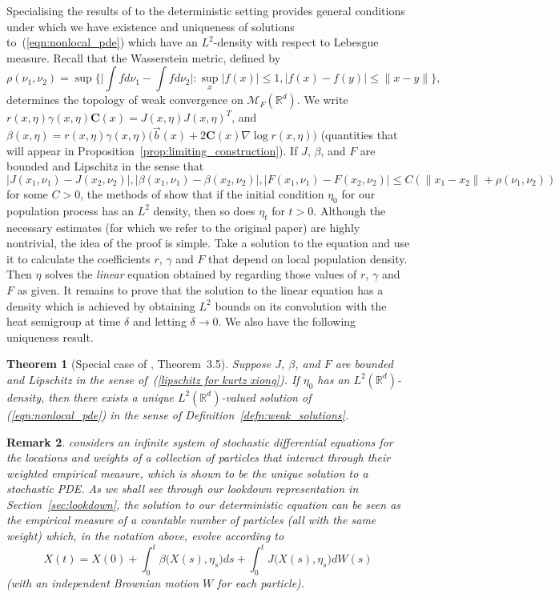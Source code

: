 \documentclass[12pt]{article}
\newtheorem{theorem}{Theorem}[section]
\newtheorem{remark}[theorem]{Remark}
\newcommand{\IR}{\mathbb R}
\newcommand{\meanq}{\vec b}    %
\newcommand{\covq}{\mathbf{C}}     %
\newcommand{\measures}{\mathcal{M}_F(\IR^d)} %
\numberwithin{equation}{section}
\begin{document}
Specialising the results of 
\citet{KURTZ1999103} to the deterministic setting
provides general conditions under which we
have existence and uniqueness of solutions to~(\ref{eqn:nonlocal_pde}) which
have an $L^2$-density with respect to Lebesgue measure. 
Recall that the Wasserstein metric, defined by 
\[\rho (\nu_1,\nu_2)=\sup\Big\{\Big|\int fd\nu_1-\int fd\nu_2\Big|:\sup_x|f(x
)|\leq 1,|f(x)-f(y)|\leq \|x-y\|\Big\},\]
determines the topology of weak convergence on $\measures$.
We write 
$r(x,\eta) \gamma(x,\eta) \covq(x) = J(x,\eta) J(x,\eta)^T$, and 
$\beta(x,\eta) = r(x,\eta) \gamma(x,\eta) \big(\meanq(x)+2\covq(x)\nabla\log r(x,\eta)\big)$
(quantities that will appear in Proposition~\ref{prop:limiting_construction}).
If $J$, $\beta$, and $F$ are bounded and Lipschitz in the sense 
that
\begin{equation}
\label{lipschitz for kurtz xiong}
|J (x_1, \nu_1)-J (x_2, \nu_2)|,|\beta (x_1,\nu_1)-\beta 
	(x_2,\nu_2)|, |F(x_1,\nu_1)-F(x_2,\nu_2)|
	\leq C(\|x_1-x_2\|+\rho (\nu_ 1,\nu_2))
\end{equation}
for some $C>0$,   
the methods of \cite{KURTZ1999103} show that %
if the initial condition $\eta_0$ for our 
population process has
an $L^2$ density, then so does $\eta_t$ for $t>0$. 
Although the necessary estimates (for which we refer to the original paper)
are highly nontrivial, 
the idea of the proof is simple. Take a solution to the
equation and use it to calculate the coefficients $r$, $\gamma$ and $F$ that depend
on local population density. Then $\eta$ solves the 
{\em linear} equation obtained by regarding those values of $r$, $\gamma$ and $F$ as given.
It remains to prove that the solution to the linear equation has a density
which is achieved by obtaining
$L^2$ bounds on its convolution with the heat semigroup at time $\delta$ and letting 
$\delta\to 0$.
We also have the following uniqueness result.
\begin{theorem}[Special case of \cite{KURTZ1999103}, Theorem~3.5]
	\label{thm:kurtzxiong}
Suppose  $J$, $\beta$, and $F$ are bounded and Lipschitz in the sense 
of~(\ref{lipschitz for kurtz xiong}).
If $\eta_0$ has an $L^2({\mathbb R}^d)$-density, then there 
exists a unique $L^2({\mathbb R}^d)$-valued  
	solution of (\ref{eqn:nonlocal_pde}) in the sense of 
	Definition~\ref{defn:weak_solutions}.
\end{theorem}
\begin{remark}
\cite{KURTZ1999103} considers an infinite system of stochastic differential equations
for the locations and weights of a collection of particles that interact through their 
weighted empirical measure, which is shown to be the unique solution to a stochastic
	PDE. As we shall see through our lookdown representation in 
Section~\ref{sec:lookdown}, the
	solution to our
	deterministic equation can be seen as the empirical measure of a 
	countable number of particles (all with the same weight)
which, in the notation above, evolve according
	to 
	\[X(t)=X(0)+\int_0^t\beta\big(X(s), \eta_s\big)ds
+\int_0^tJ\big(X(s), \eta_s\big)dW(s)\]
	(with an independent Brownian motion $W$ for each particle).
\end{remark}
\end{document}
